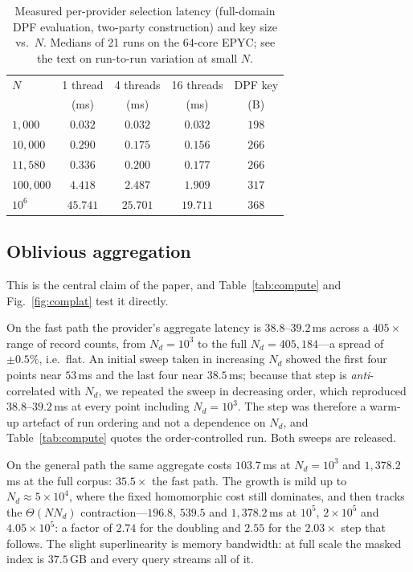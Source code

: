 \documentclass[journal]{IEEEtran}
\begin{document}
\begin{table}[t]
\centering
\caption{Measured per-provider selection latency (full-domain DPF evaluation,
two-party construction) and key size vs.\ $N$. Medians of 21 runs on the
$64$-core EPYC; see the text on run-to-run variation at small $N$.}
\label{tab:search}
\footnotesize
\renewcommand{\arraystretch}{1.2}
\begin{tabular*}{\columnwidth}{@{\extracolsep{\fill}}lcccc@{}}
\toprule
$N$ & 1 thread & 4 threads & 16 threads & DPF key \\
    & (ms)     & (ms)      & (ms)       & (B) \\
\midrule
$1{,}000$    & $0.032$  & $0.032$  & $0.032$  & $198$ \\
$10{,}000$   & $0.290$  & $0.175$  & $0.156$  & $266$ \\
$11{,}580$   & $0.336$  & $0.200$  & $0.177$  & $266$ \\
$100{,}000$  & $4.418$  & $2.487$  & $1.909$  & $317$ \\
$10^{6}$     & $45.741$ & $25.701$ & $19.711$ & $368$ \\
\bottomrule
\end{tabular*}
\end{table}

\subsection{Oblivious aggregation}
\label{sec:aggresult}
This is the central claim of the paper, and Table~\ref{tab:compute} and
Fig.~\ref{fig:complat} test it directly.

On the fast path the provider's aggregate latency is $38.8$--$39.2$\,ms across a
$405\times$ range of record counts, from $N_d=10^3$ to the full
$N_d=405{,}184$---a spread of $\pm0.5\%$, i.e.\ flat. An initial sweep taken in
increasing $N_d$ showed the first four points near $53$\,ms and the last four
near $38.5$\,ms; because that step is \emph{anti}-correlated with $N_d$, we
repeated the sweep in decreasing order, which reproduced $38.8$--$39.2$\,ms at
every point including $N_d=10^3$. The step was therefore a warm-up artefact of
run ordering and not a dependence on $N_d$, and Table~\ref{tab:compute} quotes
the order-controlled run. Both sweeps are released.

On the general path the same aggregate costs $103.7$\,ms at $N_d=10^3$ and
$1{,}378.2$\,ms at the full corpus: $35.5\times$ the fast path. The growth is
mild up to $N_d\approx5\times10^4$, where the fixed homomorphic cost still
dominates, and then tracks the $\Theta(N N_d)$ contraction---$196.8$, $539.5$
and $1{,}378.2$\,ms at $10^5$, $2\times10^5$ and $4.05\times10^5$: a factor of
$2.74$ for the doubling and $2.55$ for the $2.03\times$ step that follows. The slight
superlinearity is memory bandwidth: at full scale the masked index is
$37.5$\,GB and every query streams all of it.
\end{document}

